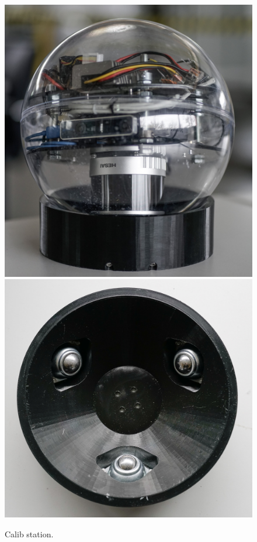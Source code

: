 \begin{figure}
  \centering
  \includegraphics[height=.17\textheight]{img/sphere_calib}
  \includegraphics[height=.17\textheight]{img/calib_station}
  \caption{Calib station.}
  \label{fig:calibstation}
\end{figure}

